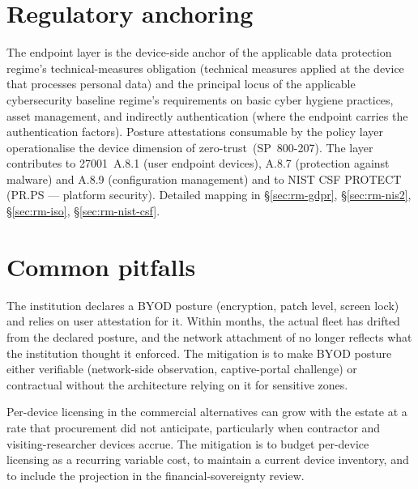\section{Regulatory anchoring}
\label{sec:ep-regulatory}

\noindent The endpoint layer is the device-side anchor of the
applicable data protection regime's technical-measures obligation
(technical measures applied at the device that processes personal
data) and the principal locus of the applicable cybersecurity
baseline regime's requirements on basic cyber hygiene practices,
asset management, and indirectly authentication (where the endpoint
carries the authentication factors). Posture attestations consumable by the
policy layer operationalise the device dimension of
zero-trust~(SP~800-207). The layer contributes to 27001~A.8.1
(user endpoint devices), A.8.7 (protection against malware) and
A.8.9 (configuration management) and to NIST CSF \textsf{PROTECT}
(PR.PS --- platform security). Detailed mapping in
 \S\ref{sec:rm-gdpr},
\S\ref{sec:rm-nis2}, \S\ref{sec:rm-iso}, \S\ref{sec:rm-nist-csf}.

\section{Common pitfalls}
\label{sec:ep-pitfalls}

\begin{pitfallbox}
\noindent The institution declares a BYOD posture (encryption,
patch level, screen lock) and relies on user attestation for it.
Within months, the actual fleet has drifted from the declared
posture, and the network attachment of  no
longer reflects what the institution thought it enforced. The
mitigation is to make BYOD posture either verifiable
(network-side observation, captive-portal challenge) or
contractual without the architecture relying on it for sensitive
zones.
\end{pitfallbox}

\begin{pitfallbox}
\noindent Per-device licensing in the commercial alternatives can
grow with the estate at a rate that procurement did not anticipate,
particularly when contractor and visiting-researcher devices accrue.
The mitigation is to budget per-device licensing as a recurring
variable cost, to maintain a current device inventory, and to
include the projection in the financial-sovereignty review.
\end{pitfallbox}

